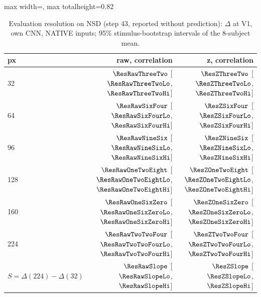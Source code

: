 \begin{table}[H]
\centering
\small
\begin{adjustbox}{max width=\textwidth, max totalheight=0.82\textheight}
\begin{tabular}{@{}lrr@{}}
\toprule
px & raw, correlation & z, correlation \\
\midrule
32 & $\ResRawThreeTwo$ [$\ResRawThreeTwoLo$, $\ResRawThreeTwoHi$] & $\ResZThreeTwo$ [$\ResZThreeTwoLo$, $\ResZThreeTwoHi$] \\
64 & $\ResRawSixFour$ [$\ResRawSixFourLo$, $\ResRawSixFourHi$] & $\ResZSixFour$ [$\ResZSixFourLo$, $\ResZSixFourHi$] \\
96 & $\ResRawNineSix$ [$\ResRawNineSixLo$, $\ResRawNineSixHi$] & $\ResZNineSix$ [$\ResZNineSixLo$, $\ResZNineSixHi$] \\
128 & $\ResRawOneTwoEight$ [$\ResRawOneTwoEightLo$, $\ResRawOneTwoEightHi$] & $\ResZOneTwoEight$ [$\ResZOneTwoEightLo$, $\ResZOneTwoEightHi$] \\
160 & $\ResRawOneSixZero$ [$\ResRawOneSixZeroLo$, $\ResRawOneSixZeroHi$] & $\ResZOneSixZero$ [$\ResZOneSixZeroLo$, $\ResZOneSixZeroHi$] \\
224 & $\ResRawTwoTwoFour$ [$\ResRawTwoTwoFourLo$, $\ResRawTwoTwoFourHi$] & $\ResZTwoTwoFour$ [$\ResZTwoTwoFourLo$, $\ResZTwoTwoFourHi$] \\
$S = \Delta(224) - \Delta(32)$ & $\ResRawSlope$ [$\ResRawSlopeLo$, $\ResRawSlopeHi$] & $\ResZSlope$ [$\ResZSlopeLo$, $\ResZSlopeHi$] \\
\bottomrule
\end{tabular}
\end{adjustbox}
\caption{Evaluation resolution on NSD (step 43, reported without prediction): $\Delta$ at V1, own CNN, NATIVE inputs; 95\% stimulus-bootstrap intervals of the 8-subject mean.}
\label{tab:nsdres}
\end{table}
